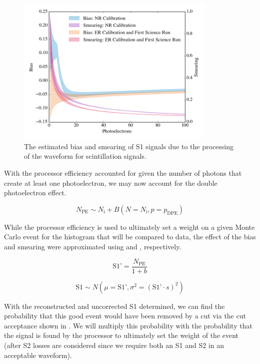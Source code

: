 \begin{figure}[t]
	\centering
	\includegraphics[width=0.85\textwidth]{xe1t_pax_s1_bias}
	\caption{The estimated bias and smearing of S1 signals due to the processing of the waveform for scintillation signals.}
	\label{fig:xe1t_pax_sb}
\end{figure}

With the processor efficiency accounted for given the number of photons that create at least one photoelectron, we may now account for the double photoelectron effect.  

\begin{equation}
        N_{\textrm{PE}} \sim N_{\textrm{i}} + B(N=N_{\textrm{i}}, p=p_{\textrm{DPE}})
\end{equation}


While the processor efficiency is used to ultimately set a weight on a given Monte Carlo event for the histogram that will be compared to data, the effect of the bias and smearing were approximated using  and , respectively.  

\begin{equation}
        \label{eqn:xe1t_s1_bias}
        \textrm{S1'} = \frac{N_{\textrm{PE}}}{1 + b}
\end{equation}


\begin{equation}
        \label{eqn:xe1t_s1_smearing}
        \textrm{S1} \sim N(\mu = \textrm{S1'}, \sigma^2 = (\textrm{S1'} \cdot s)^2)
\end{equation}


With the reconstructed and uncorrected S1 determined, we can find the probability that this good event would have been removed by a cut via the cut acceptance shown in .  We will multiply this probability with the probability that the signal is found by the processor to ultimately set the weight of the event (after S2 losses are considered since we require both an S1 and S2 in an acceptable waveform).


